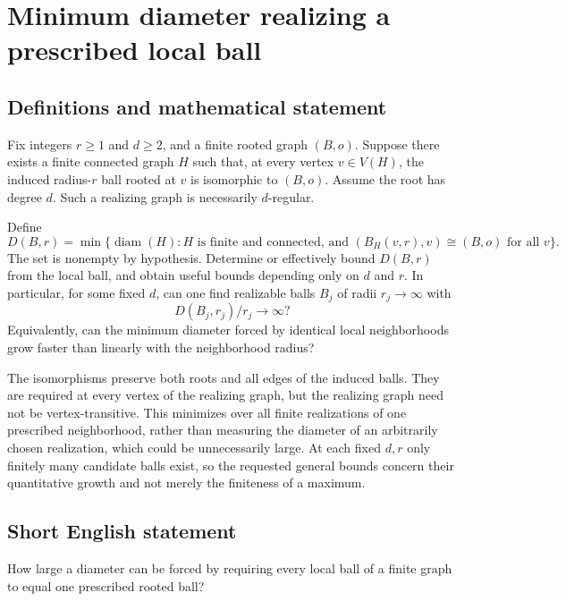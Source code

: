 \documentclass[11pt,a4paper]{article}
\begin{document}
\section*{Minimum diameter realizing a prescribed local ball}\label{statement}

\subsection{Definitions and mathematical statement}
Fix integers $r\ge1$ and $d\ge2$, and a finite rooted graph $(B,o)$. Suppose there exists a finite connected graph $H$ such that, at every vertex $v\in V(H)$, the induced radius-$r$ ball rooted at $v$ is isomorphic to $(B,o)$. Assume the root has degree $d$. Such a realizing graph is necessarily $d$-regular.

Define
\[
D(B,r)=\min\{\operatorname{diam}(H):H\text{ is finite and connected, and }
(B_H(v,r),v)\cong(B,o)\text{ for all }v\}.
\]
The set is nonempty by hypothesis. Determine or effectively bound $D(B,r)$ from the local ball, and obtain useful bounds depending only on $d$ and $r$. In particular, for some fixed $d$, can one find realizable balls $B_j$ of radii $r_j\to\infty$ with
\[
D(B_j,r_j)/r_j\longrightarrow\infty?
\]
Equivalently, can the minimum diameter forced by identical local neighborhoods grow faster than linearly with the neighborhood radius?

The isomorphisms preserve both roots and all edges of the induced balls. They are required at every vertex of the realizing graph, but the realizing graph need not be vertex-transitive. This minimizes over all finite realizations of one prescribed neighborhood, rather than measuring the diameter of an arbitrarily chosen realization, which could be unnecessarily large. At each fixed $d,r$ only finitely many candidate balls exist, so the requested general bounds concern their quantitative growth and not merely the finiteness of a maximum.
\subsection{Short English statement}
How large a diameter can be forced by requiring every local ball of a finite graph to equal one prescribed rooted ball?
\end{document}
